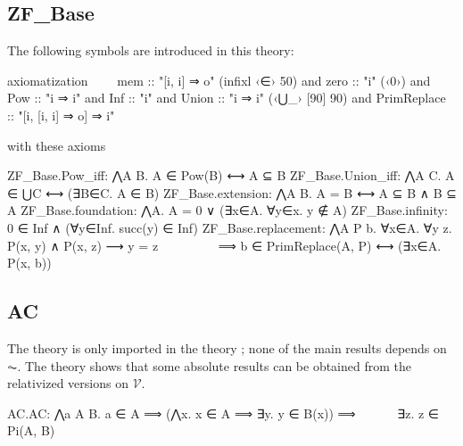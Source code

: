 \subsection{ZF\_Base}
The following symbols are introduced in this theory:
\begin{isabelle}
axiomatization\isanewline
\ \ \ \      mem :: "[i, i] ⇒ o"  (infixl ‹∈› 50)  \isanewline
  and zero :: "i"  (‹0›)  \isanewline
  and Pow :: "i ⇒ i"  \isanewline
  and Inf :: "i"  \isanewline
  and Union :: "i ⇒ i"  (‹⋃\_› [90] 90)\isanewline
  and PrimReplace :: "[i, [i, i] ⇒ o] ⇒ i"
\end{isabelle}
\noindent with these axioms
\begin{isabelle}
ZF\_Base.Pow\_iff: ⋀A B. A ∈ Pow(B) ⟷ A ⊆ B\isanewline
ZF\_Base.Union\_iff: ⋀A C. A ∈ ⋃C ⟷ (∃B∈C. A ∈ B)\isanewline
ZF\_Base.extension: ⋀A B. A = B ⟷ A ⊆ B ∧ B ⊆ A\isanewline
ZF\_Base.foundation: ⋀A. A = 0 ∨ (∃x∈A. ∀y∈x. y ∉ A)\isanewline
ZF\_Base.infinity: 0 ∈ Inf ∧ (∀y∈Inf. succ(y) ∈ Inf)\isanewline
ZF\_Base.replacement: ⋀A P b. ∀x∈A. ∀y z. P(x, y) ∧ P(x, z) ⟶ y = z \isanewline
\ \ \ \ \ \ \ \ \ ⟹ b ∈ PrimReplace(A, P) ⟷ (∃x∈A. P(x, b))
\end{isabelle}

\subsection{AC}

The theory  is only imported in the theory
; none of the main results
depends on $\AC$. The theory 
shows that some absolute results can be obtained from the
relativized versions on $\mathcal{V}$.

\begin{isabelle}
AC.AC: ⋀a A B. a ∈ A ⟹ (⋀x. x ∈ A ⟹ ∃y. y ∈ B(x)) ⟹\isanewline
  \ \ \ \ \ \ ∃z. z ∈ Pi(A, B)
\end{isabelle}

